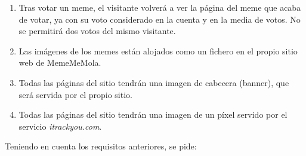 \begin{enumerate}
  \item Tras votar un meme, el visitante volverá a ver la página del meme que acaba de votar, ya con su voto considerado en la cuenta y en la media de votos. No se permitirá dos votos del mismo visitante.
  \item Las imágenes de los memes están alojados como un fichero en el propio sitio web de MemeMeMola.
  \item Todas las páginas del sitio tendrán una imagen de cabecera (banner), que será servida por el propio sitio.
  \item Todas las páginas del sitio tendrán una imagen de un píxel servido por el servicio \emph{itrackyou.com}.
\end{enumerate}

\newpage

Teniendo en cuenta los requisitos anteriores, se pide:

